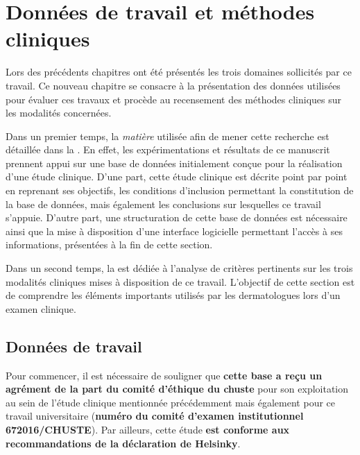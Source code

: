 \renewcommand{\thechapter}{\arabic{chapter}}
\setcounter{chapter}{3}

\chapter{Données de travail et méthodes cliniques}
\label{chap:chapter_4}
\chapterintro
Lors des précédents chapitres ont été présentés les trois domaines sollicités par ce travail. Ce nouveau chapitre se consacre à la présentation des données utilisées pour évaluer ces travaux et procède au recensement des méthodes cliniques sur les modalités concernées.\par

Dans un premier temps, la \textit{matière} utilisée afin de mener cette recherche est détaillée dans la . En effet, les expérimentations et résultats de ce manuscrit prennent appui sur une base de données initialement conçue pour la réalisation d'une étude clinique.  D’une part, cette étude clinique est décrite point par point en reprenant ses objectifs, les conditions d'inclusion permettant la constitution de la base de données, mais également les conclusions sur lesquelles ce travail s'appuie. D’autre part, une structuration de cette base de données est nécessaire ainsi que la mise à disposition d’une interface logicielle permettant l’accès à ses informations, présentées à la fin de cette section.\par

Dans un second temps, la  est dédiée à l’analyse de critères pertinents sur les trois modalités cliniques mises à disposition de ce travail. L'objectif de cette section est de comprendre les éléments importants utilisés par les dermatologues lors d'un examen clinique.\par
\newpage

\section{Données de travail}
\label{sec:clinical_data}
Pour commencer, il est nécessaire de souligner que \textbf{cette base a reçu un agrément de la part du comité d'éthique du \acrfull{chuste}} pour son exploitation au sein de l'étude clinique mentionnée précédemment mais également pour ce travail universitaire (\textbf{numéro du comité d'examen institutionnel 672016/CHUSTE}). Par ailleurs, cette étude \textbf{est conforme aux recommandations de la déclaration de Helsinky}.\par

